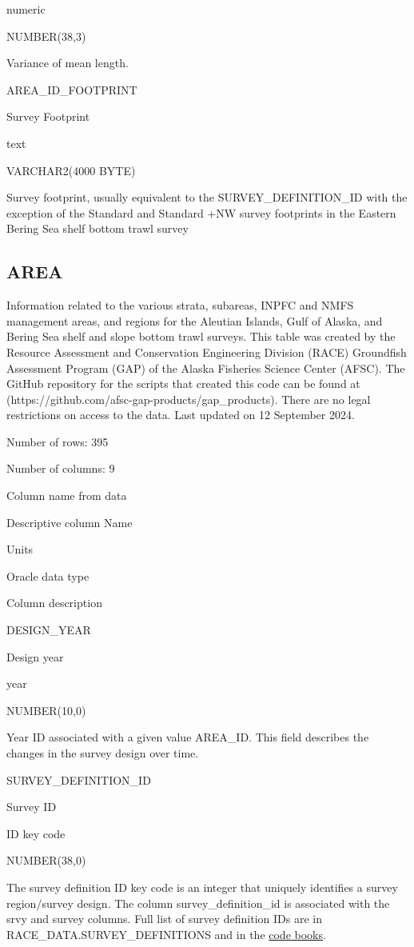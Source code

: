 \documentclass[
  letterpaper,
  oneside,
  open=any]{scrbook}
\begin{document}
numeric

NUMBER(38,3)

Variance of mean length.

AREA\_ID\_FOOTPRINT

Survey Footprint

text

VARCHAR2(4000 BYTE)

Survey footprint, usually equivalent to the SURVEY\_DEFINITION\_ID with
the exception of the Standard and Standard +NW survey footprints in the
Eastern Bering Sea shelf bottom trawl survey

\subsection{AREA}\label{area}

Information related to the various strata, subareas, INPFC and NMFS
management areas, and regions for the Aleutian Islands, Gulf of Alaska,
and Bering Sea shelf and slope bottom trawl surveys. This table was
created by the Resource Assessment and Conservation Engineering Division
(RACE) Groundfish Assessment Program (GAP) of the Alaska Fisheries
Science Center (AFSC). The GitHub repository for the scripts that
created this code can be found at
(https://github.com/afsc-gap-products/gap\_products). There are no legal
restrictions on access to the data. Last updated on 12 September 2024.

Number of rows: 395

Number of columns: 9

Column name from data

Descriptive column Name

Units

Oracle data type

Column description

DESIGN\_YEAR

Design year

year

NUMBER(10,0)

Year ID associated with a given value AREA\_ID. This field describes the
changes in the survey design over time.

SURVEY\_DEFINITION\_ID

Survey ID

ID key code

NUMBER(38,0)

The survey definition ID key code is an integer that uniquely identifies
a survey region/survey design. The column survey\_definition\_id is
associated with the srvy and survey columns. Full list of survey
definition IDs are in RACE\_DATA.SURVEY\_DEFINITIONS and in the
\href{https://www.fisheries.noaa.gov/resource/document/groundfish-survey-species-code-manual-and-data-codes-manual}{code
books}.
\end{document}
